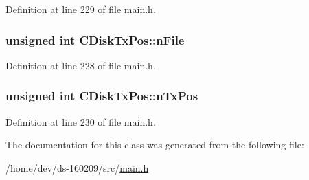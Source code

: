 Definition at line 229 of file main.\+h.

\hypertarget{class_c_disk_tx_pos_a07198e7b96d4c60ece4d895abbd46104}{}
\subsubsection[{n\+File}]{\setlength{\rightskip}{0pt plus 5cm}unsigned int C\+Disk\+Tx\+Pos\+::n\+File}\label{class_c_disk_tx_pos_a07198e7b96d4c60ece4d895abbd46104}


Definition at line 228 of file main.\+h.

\hypertarget{class_c_disk_tx_pos_ad86f9cef782e44a0e5bfe1fae9ed6593}{}
\subsubsection[{n\+Tx\+Pos}]{\setlength{\rightskip}{0pt plus 5cm}unsigned int C\+Disk\+Tx\+Pos\+::n\+Tx\+Pos}\label{class_c_disk_tx_pos_ad86f9cef782e44a0e5bfe1fae9ed6593}


Definition at line 230 of file main.\+h.



The documentation for this class was generated from the following file\+:\begin{DoxyCompactItemize}
\item 
/home/dev/ds-\/160209/src/\hyperlink{main_8h}{main.\+h}\end{DoxyCompactItemize}
